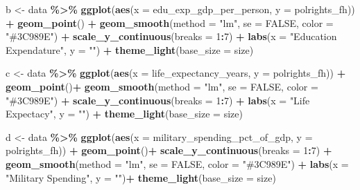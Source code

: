 \documentclass[
  english,
  man,floatsintext]{apa6}
\newenvironment{Shaded}{\begin{snugshade}}{\end{snugshade}}
\newcommand{\DataTypeTok}[1]{\textcolor[rgb]{0.13,0.29,0.53}{#1}}
\newcommand{\DecValTok}[1]{\textcolor[rgb]{0.00,0.00,0.81}{#1}}
\newcommand{\KeywordTok}[1]{\textcolor[rgb]{0.13,0.29,0.53}{\textbf{#1}}}
\newcommand{\NormalTok}[1]{#1}
\newcommand{\OperatorTok}[1]{\textcolor[rgb]{0.81,0.36,0.00}{\textbf{#1}}}
\newcommand{\OtherTok}[1]{\textcolor[rgb]{0.56,0.35,0.01}{#1}}
\newcommand{\StringTok}[1]{\textcolor[rgb]{0.31,0.60,0.02}{#1}}
\begin{document}
\begin{Shaded}
\begin{Highlighting}[]
\NormalTok{b \textless{}{-}}\StringTok{ }\NormalTok{data }\OperatorTok{\%\textgreater{}\%}\StringTok{ }
\StringTok{  }\KeywordTok{ggplot}\NormalTok{(}\KeywordTok{aes}\NormalTok{(}\DataTypeTok{x =}\NormalTok{ edu\_exp\_gdp\_per\_person, }\DataTypeTok{y =}\NormalTok{ polrights\_fh)) }\OperatorTok{+}\StringTok{ }
\StringTok{  }\KeywordTok{geom\_point}\NormalTok{() }\OperatorTok{+}\StringTok{ }
\StringTok{  }\KeywordTok{geom\_smooth}\NormalTok{(}\DataTypeTok{method =} \StringTok{"lm"}\NormalTok{, }\DataTypeTok{se =} \OtherTok{FALSE}\NormalTok{, }\DataTypeTok{color =} \StringTok{"\#3C989E"}\NormalTok{) }\OperatorTok{+}
\StringTok{    }\KeywordTok{scale\_y\_continuous}\NormalTok{(}\DataTypeTok{breaks =} \DecValTok{1}\OperatorTok{:}\DecValTok{7}\NormalTok{) }\OperatorTok{+}\StringTok{ }
\StringTok{  }\KeywordTok{labs}\NormalTok{(}\DataTypeTok{x =} \StringTok{"Education Expendature"}\NormalTok{, }\DataTypeTok{y =} \StringTok{""}\NormalTok{) }\OperatorTok{+}
\StringTok{  }\KeywordTok{theme\_light}\NormalTok{(}\DataTypeTok{base\_size =}\NormalTok{ size)}

\NormalTok{c \textless{}{-}}\StringTok{ }\NormalTok{data }\OperatorTok{\%\textgreater{}\%}\StringTok{ }
\StringTok{  }\KeywordTok{ggplot}\NormalTok{(}\KeywordTok{aes}\NormalTok{(}\DataTypeTok{x =}\NormalTok{ life\_expectancy\_years, }\DataTypeTok{y =}\NormalTok{ polrights\_fh)) }\OperatorTok{+}\StringTok{ }
\StringTok{  }\KeywordTok{geom\_point}\NormalTok{()}\OperatorTok{+}\StringTok{ }
\StringTok{  }\KeywordTok{geom\_smooth}\NormalTok{(}\DataTypeTok{method =} \StringTok{"lm"}\NormalTok{, }\DataTypeTok{se =} \OtherTok{FALSE}\NormalTok{, }\DataTypeTok{color =} \StringTok{"\#3C989E"}\NormalTok{) }\OperatorTok{+}
\StringTok{    }\KeywordTok{scale\_y\_continuous}\NormalTok{(}\DataTypeTok{breaks =} \DecValTok{1}\OperatorTok{:}\DecValTok{7}\NormalTok{) }\OperatorTok{+}\StringTok{ }
\StringTok{  }\KeywordTok{labs}\NormalTok{(}\DataTypeTok{x =} \StringTok{"Life Expectacy"}\NormalTok{, }\DataTypeTok{y =} \StringTok{""}\NormalTok{) }\OperatorTok{+}
\StringTok{  }\KeywordTok{theme\_light}\NormalTok{(}\DataTypeTok{base\_size =}\NormalTok{ size)}

\NormalTok{d \textless{}{-}}\StringTok{ }\NormalTok{data }\OperatorTok{\%\textgreater{}\%}\StringTok{ }
\StringTok{  }\KeywordTok{ggplot}\NormalTok{(}\KeywordTok{aes}\NormalTok{(}\DataTypeTok{x =}\NormalTok{ military\_spending\_pct\_of\_gdp, }\DataTypeTok{y =}\NormalTok{ polrights\_fh)) }\OperatorTok{+}\StringTok{ }
\StringTok{  }\KeywordTok{geom\_point}\NormalTok{()}\OperatorTok{+}\StringTok{ }
\StringTok{  }\KeywordTok{scale\_y\_continuous}\NormalTok{(}\DataTypeTok{breaks =} \DecValTok{1}\OperatorTok{:}\DecValTok{7}\NormalTok{) }\OperatorTok{+}\StringTok{ }
\StringTok{  }\KeywordTok{geom\_smooth}\NormalTok{(}\DataTypeTok{method =} \StringTok{"lm"}\NormalTok{, }\DataTypeTok{se =} \OtherTok{FALSE}\NormalTok{, }\DataTypeTok{color =} \StringTok{"\#3C989E"}\NormalTok{) }\OperatorTok{+}\StringTok{ }
\StringTok{  }\KeywordTok{labs}\NormalTok{(}\DataTypeTok{x =} \StringTok{"Military Spending"}\NormalTok{, }\DataTypeTok{y =} \StringTok{""}\NormalTok{)}\OperatorTok{+}\StringTok{ }\KeywordTok{theme\_light}\NormalTok{(}\DataTypeTok{base\_size =}\NormalTok{ size)}


\end{Highlighting}
\end{Shaded}
\end{document}
